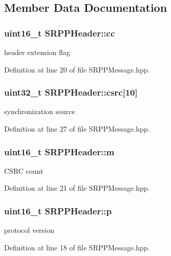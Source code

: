 \subsection{Member Data Documentation}
\hypertarget{struct_s_r_p_p_header_abee69fd2801a6ead6de88d5989e26af7}{
\subsubsection[{cc}]{\setlength{\rightskip}{0pt plus 5cm}uint16\_\-t {\bf SRPPHeader::cc}}}
\label{struct_s_r_p_p_header_abee69fd2801a6ead6de88d5989e26af7}
header extension flag 

Definition at line 20 of file SRPPMessage.hpp.

\hypertarget{struct_s_r_p_p_header_a8f6ad282b736de43846c450e20976348}{
\subsubsection[{csrc}]{\setlength{\rightskip}{0pt plus 5cm}uint32\_\-t {\bf SRPPHeader::csrc}\mbox{[}10\mbox{]}}}
\label{struct_s_r_p_p_header_a8f6ad282b736de43846c450e20976348}
synchronization source 

Definition at line 27 of file SRPPMessage.hpp.

\hypertarget{struct_s_r_p_p_header_a873e88c91c1dff5650ff8cef39da6c5e}{
\subsubsection[{m}]{\setlength{\rightskip}{0pt plus 5cm}uint16\_\-t {\bf SRPPHeader::m}}}
\label{struct_s_r_p_p_header_a873e88c91c1dff5650ff8cef39da6c5e}
CSRC count 

Definition at line 21 of file SRPPMessage.hpp.

\hypertarget{struct_s_r_p_p_header_a5fea95f882c0d6dc145db5206179d09a}{
\subsubsection[{p}]{\setlength{\rightskip}{0pt plus 5cm}uint16\_\-t {\bf SRPPHeader::p}}}
\label{struct_s_r_p_p_header_a5fea95f882c0d6dc145db5206179d09a}
protocol version 

Definition at line 18 of file SRPPMessage.hpp.

